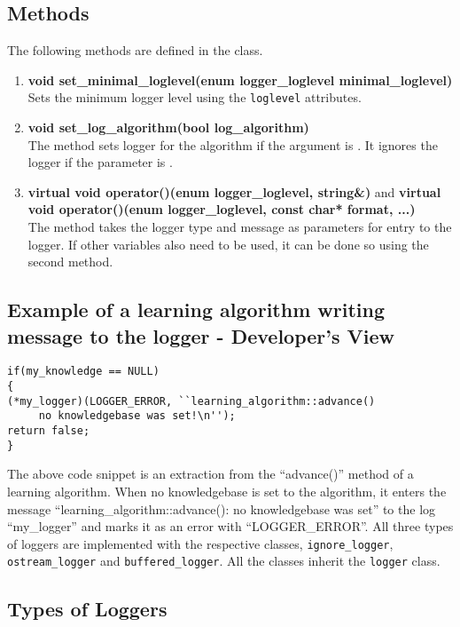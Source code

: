 \subsection*{Methods}
The following methods are defined in the class.
\begin{enumerate}
 \item \textbf{void set\_minimal\_loglevel(enum logger\_loglevel minimal\_loglevel)} \\
	Sets the minimum logger level using the \texttt{loglevel} attributes.
 \item \textbf{void set\_log\_algorithm(bool log\_algorithm)} \\
	The method sets logger for the algorithm if the argument is \true. It ignores the logger if the parameter is \false. 
 \item \textbf{virtual void operator()(enum logger\_loglevel, string\&)} and \textbf{virtual void operator()(enum logger\_loglevel, 	const char* format, ...)} \\
	The method takes the logger type and message as parameters for entry to the logger. If other variables also need to be used, it can be done so using the second method. 
\end{enumerate}

\subsection*{Example of a learning algorithm writing message to the logger - Developer's View}
\begin{lstlisting}
if(my_knowledge == NULL) 
{
(*my_logger)(LOGGER_ERROR, ``learning_algorithm::advance() 
     no knowledgebase was set!\n'');
return false; 
}
\end{lstlisting}
The above code snippet is an extraction from the ``advance()'' method of a learning algorithm. When no knowledgebase is set to the algorithm, it enters the message ``learning\_algorithm::advance(): no knowledgebase was set'' to the log ``my\_logger'' and marks it as an error with ``LOGGER\_ERROR''. 
\vskip 1pt
All three types of loggers are implemented with the respective classes, \texttt{ignore\_logger}, \texttt{ostream\_logger} and \texttt{buffered\_logger}. All the classes inherit the \texttt{logger} class. \\

\subsection{Types of Loggers}
\label{sec:types}

